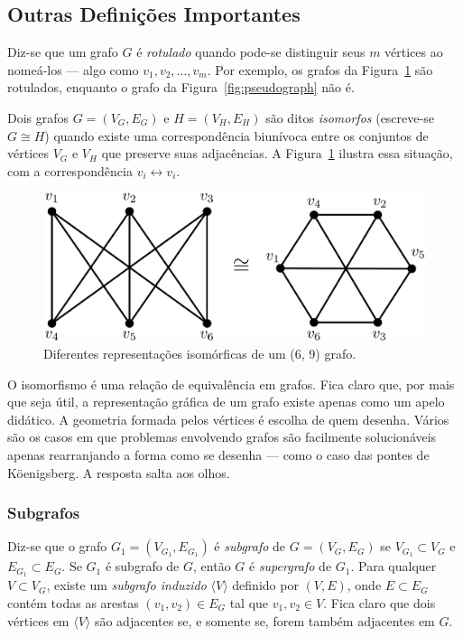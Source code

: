 \documentclass[a4paper,12pt]{article}
\begin{document}
\subsection{Outras Definições Importantes}

Diz-se que um grafo $G$ é \textit{rotulado} quando pode-se distinguir seus $m$ vértices ao nomeá-los --- algo como $v_1, v_2, \dots, v_m$. Por exemplo, os grafos da Figura~\ref{fig:graphisomorphic} são rotulados, enquanto o grafo da Figura~\ref{fig:pseudograph} não é. 

Dois grafos $G = (V_G, E_G)$ e $H = (V_H, E_H)$ são ditos \textit{isomorfos} (escreve-se $G \cong H$) quando existe uma correspondência biunívoca entre os conjuntos de vértices $V_G$ e $V_H$ que preserve suas adjacências. A Figura~\ref{fig:graphisomorphic} ilustra essa situação, com a correspondência $v_i \longleftrightarrow v_i$.

\begin{figure}[H]
	\begin{center}
		\includegraphics[width=0.6\linewidth]{figures/graphisomorphic.png}
	\end{center}
	\caption{Diferentes representações isomórficas de um (6, 9) grafo.}
	\label{fig:graphisomorphic}
\end{figure}

O isomorfismo é uma relação de equivalência em grafos. Fica claro que, por mais que seja útil, a representação gráfica de um grafo existe apenas como um apelo didático. A geometria formada pelos vértices é escolha de quem desenha. Vários são os casos em que problemas envolvendo grafos são facilmente solucionáveis apenas rearranjando a forma como se desenha --- como o caso das pontes de Köenigsberg. A resposta salta aos olhos.

\subsubsection{Subgrafos}

Diz-se que o grafo $G_1 = (V_{G_1}, E_{G_1})$ é \textit{subgrafo} de $G = (V_G, E_G)$ se $V_{G_1} \subset V_G$ e $E_{G_1} \subset E_G$. Se $G_1$ é subgrafo de $G$, então $G$ é \textit{supergrafo} de $G_1$. Para qualquer $V \subset V_G$, existe um \textit{subgrafo induzido} $\langle V \rangle$ definido por $(V, E)$, onde $E \subset E_G$ contém todas as arestas $(v_1, v_2) \in E_G$ tal que $v_1, v_2 \in V$. 
Fica claro que dois vértices em $\langle V \rangle$ são adjacentes se, e somente se, forem também adjacentes em $G$.
\end{document}

